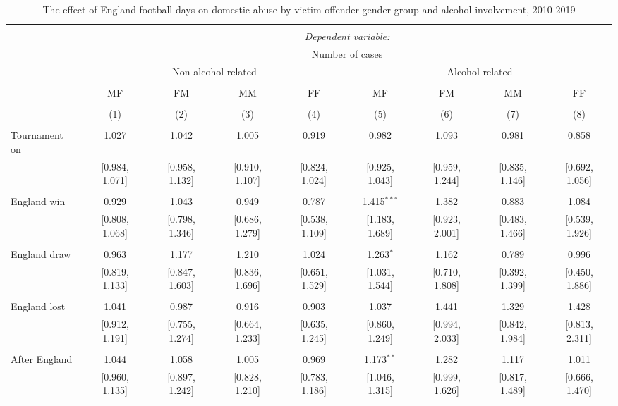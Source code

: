 \documentclass[12pt, a4paper]{article}
\begin{document}
\begin{table}
\centering
 \caption{The effect of England football days on domestic abuse by victim-offender gender group and alcohol-involvement, 2010-2019}
   \label{gender}
 \begin{threeparttable}
\begin{tabular}{@{\extracolsep{1pt}}lcccccccc} 
\\[-1.8ex]\hline 
\hline \\[-1.8ex] 
 & \multicolumn{8}{c}{\textit{Dependent variable:}} \\ 
   & \multicolumn{8}{c}{Number of cases} \\ 
  & \multicolumn{4}{c}{Non-alcohol related} &\multicolumn{4}{c}{Alcohol-related} \\ 
\cline{2-9} 
\\[-1.8ex] & MF & FM & MM & FF & MF & FM & MM & FF \\ 
\\[-1.8ex] & (1) & (2) & (3) & (4) & (5) & (6) & (7) & (8)\\ 
\hline \\[-1.8ex] 
 Tournament on & 1.027 & 1.042 & 1.005 & 0.919 & 0.982 & 1.093 & 0.981 & 0.858 \\ 
  & [0.984, 1.071] & [0.958, 1.132] & [0.910, 1.107] & [0.824, 1.024] & [0.925, 1.043] & [0.959, 1.244] & [0.835, 1.146] & [0.692, 1.056] \\ 
  & & & & & & & & \\ 
 England win & 0.929 & 1.043 & 0.949 & 0.787 & 1.415$^{***}$ & 1.382 & 0.883 & 1.084 \\ 
  & [0.808, 1.068] & [0.798, 1.346] & [0.686, 1.279] & [0.538, 1.109] & [1.183, 1.689] & [0.923, 2.001] & [0.483, 1.466] & [0.539, 1.926] \\ 
  & & & & & & & & \\ 
 England draw & 0.963 & 1.177 & 1.210 & 1.024 & 1.263$^{*}$ & 1.162 & 0.789 & 0.996 \\ 
  & [0.819, 1.133] & [0.847, 1.603] & [0.836, 1.696] & [0.651, 1.529] & [1.031, 1.544] & [0.710, 1.808] & [0.392, 1.399] & [0.450, 1.886] \\ 
  & & & & & & & & \\ 
 England lost & 1.041 & 0.987 & 0.916 & 0.903 & 1.037 & 1.441 & 1.329 & 1.428 \\ 
  & [0.912, 1.191] & [0.755, 1.274] & [0.664, 1.233] & [0.635, 1.245] & [0.860, 1.249] & [0.994, 2.033] & [0.842, 1.984] & [0.813, 2.311] \\ 
  & & & & & & & & \\ 
 After England & 1.044 & 1.058 & 1.005 & 0.969 & 1.173$^{**}$ & 1.282 & 1.117 & 1.011 \\ 
  & [0.960, 1.135] & [0.897, 1.242] & [0.828, 1.210] & [0.783, 1.186] & [1.046, 1.315] & [0.999, 1.626] & [0.817, 1.489] & [0.666, 1.470] \\


\end{tabular}
\end{threeparttable}
\end{table}
\end{document}
